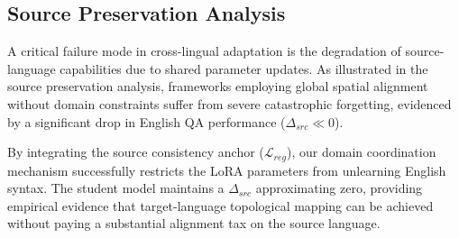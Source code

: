 \documentclass[11pt]{article}
\begin{document}
\subsection{Source Preservation Analysis}
\begin{table}[t]
\centering
\small
{}
\caption{Analysis of source preservation ($\Delta_{src}$) on English SQuAD 2.0 (in-domain, i.e.\ the Stage-1 training distribution), alongside held-out English XQuAD-en and MLQA-en (the exact English counterparts of the XQuAD-vi/MLQA-vi transfer targets used elsewhere in this paper). $\Delta_{src} = F1_{post\text{-}align} - F1_{pre\text{-}align}$.}
\label{tab:source_preservation}
\end{table}

A critical failure mode in cross-lingual adaptation is the degradation of source-language capabilities due to shared parameter updates. As illustrated in the source preservation analysis, frameworks employing global spatial alignment without domain constraints suffer from severe catastrophic forgetting, evidenced by a significant drop in English QA performance ($\Delta_{src} \ll 0$). 

By integrating the source consistency anchor ($\mathcal{L}_{reg}$), our domain coordination mechanism successfully restricts the LoRA parameters from unlearning English syntax. The student model maintains a $\Delta_{src}$ approximating zero, providing empirical evidence that target-language topological mapping can be achieved without paying a substantial alignment tax on the source language.
\end{document}
